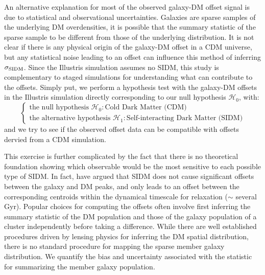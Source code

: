 An alternative explanation for most of the observed galaxy-DM offset signal is due to 
statistical and observational uncertainties. Galaxies are
sparse samples of the underlying DM overdensities, it is possible that the 
summary statistic of the sparse sample to be different from those of the 
underlying distribution. It is not clear if there is any physical
origin of the galaxy-DM offset in a CDM universe, 
but any statistical noise leading to an offset can influence this method of 
inferring $\sigma_{\rm SIDM}$. 
Since the Illustris simulation assumes no SIDM, this study is complementary to 
staged simulations for understanding what can contribute to the offsets.
Simply put, we perform a hypothesis test with the galaxy-DM offsets in
the Illustris simulation directly corresponding to our null hypothesis
$\mathcal{H}_0$, with: 
\begin{equation}
\begin{cases}
	\text{the null hypothesis }\mathcal{H}_0: \text{Cold Dark Matter (CDM)} \\
	\text{the alternative hypothesis }\mathcal{H}_1: \text{Self-interacting Dark
	Matter (SIDM)} 
\end{cases}
\end{equation}
and we try to see if the observed offset data can be compatible with offsets
dervied from a CDM simulation. 


This exercise is further complicated by the fact that there is no theoretical
foundation showing which observable would be the most sensitive to each
possible type of SIDM. In fact, \cite{Kahlhoefer14} have argued that SIDM 
does not cause
significant offsets between the galaxy and DM peaks, and only leads to an offset
between the corresponding centroids within the dynamical timescale for
relaxation ($\sim$ several Gyr). 
Popular choices for computing the offsets often involve first inferring the summary
statistic of the DM population and those of the galaxy population of a cluster
independently before taking a difference.
While there are well established procedures driven by lensing physics for 
inferring the DM spatial distribution, there is no standard procedure for
mapping the sparse member galaxy distribution. 
We quantify the bias and uncertainty associated with the
statistic for summarizing the member galaxy population. 

